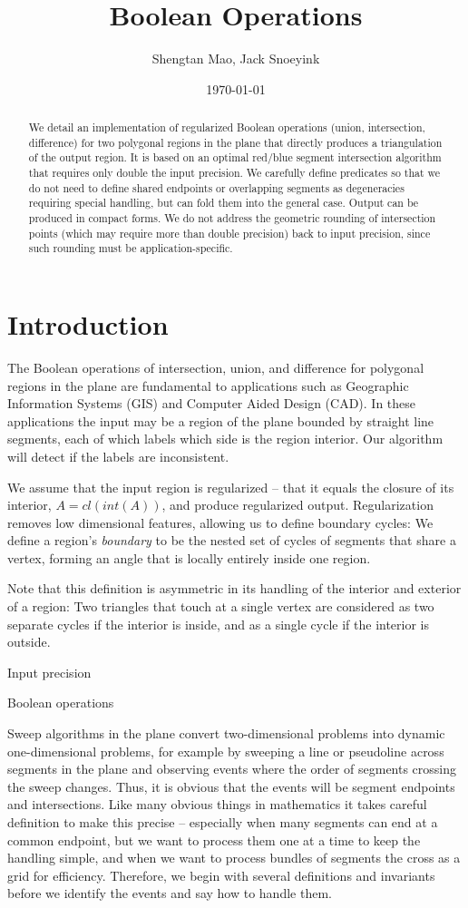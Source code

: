 \documentclass[11pt]{article}
\title{Boolean Operations}
\author{Shengtan Mao, Jack Snoeyink}
\date{\today}
\begin{document}
\maketitle
\begin{abstract}
We detail an implementation of regularized Boolean operations (union, intersection, difference) for two polygonal regions in the plane that directly produces a triangulation of the output region. 
It is based on an optimal red/blue segment intersection algorithm that requires only double the input precision.  
We carefully define predicates so that we do not need to define shared endpoints or overlapping segments as degeneracies requiring special handling, but can fold them into the general case.  
Output can be produced in compact forms.  
We do not address the geometric rounding of intersection points (which may require more than double precision) back to input precision, since such rounding must be application-specific.
\end{abstract}
\section{Introduction}

The Boolean operations of intersection, union, and difference for polygonal regions in the plane are fundamental to applications such as Geographic Information Systems (GIS)
and Computer Aided Design (CAD).  
In these applications the input may be a region of the plane bounded by straight line segments, 
each of which labels which side is the region interior.  
Our algorithm will detect if the labels are inconsistent.

We assume that the input region is regularized -- that it equals the closure of its interior, 
$A= \textit{cl}(\textit{int}(A))$, and produce regularized output. 
Regularization removes low dimensional features, allowing us to define boundary cycles: 
We define a region's \textit{boundary} to be the nested set of cycles of segments that share a vertex, forming an angle that is locally entirely inside one region.

Note that this definition is asymmetric in its handling of the interior and exterior of a region:  Two triangles that touch at a single vertex are considered as two separate cycles if the interior is inside, and as a single cycle if the interior is outside.  

Input precision

Boolean operations

Sweep algorithms in the plane convert two-dimensional problems into dynamic one-dimensional problems,
for example by sweeping a line or pseudoline across segments in the
plane and observing events where the order of segments crossing the sweep changes.
Thus, it is obvious that the events will be segment endpoints and intersections. Like many obvious things in mathematics it takes careful definition to make this precise -- especially when many segments can end at a common endpoint, but we want to process them one at a time to keep the handling simple, and when we want to process bundles of segments the cross as a grid for efficiency.  
Therefore, we begin with several definitions and invariants before we identify the events and say how to handle them. 
\end{document}

